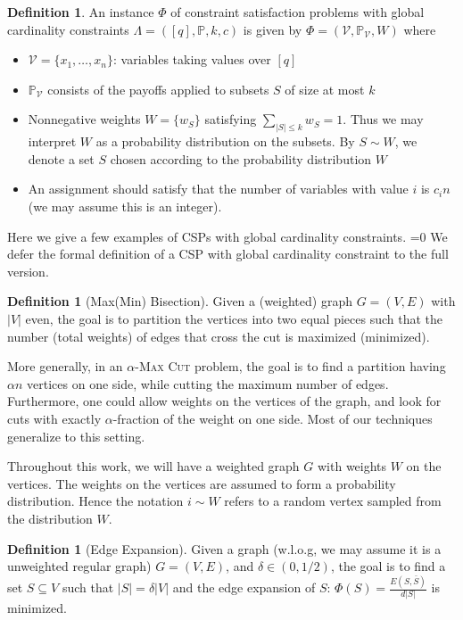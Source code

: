 \documentclass[11pt]{article}
\def\full{1}
\theoremstyle{definition}
\newtheorem{definition}[theorem]{Definition}
\newcommand{\problemmacro}[1]{\texorpdfstring{\textsc{#1}}{#1}\xspace}
\newcommand{\maxcut}{\problemmacro{Max Cut}}
\renewcommand{\leq}{\leqslant}
\numberwithin{equation}{section}
\begin{document}
\begin{definition}
An instance $\Phi$ of constraint satisfaction problems with global
cardinality constraints $\Lambda=([q],\mathbb{P},k,c)$ is given by $\Phi=(\mathcal{V},\mathbb{P}_{\mathcal{V}},W)$ where
\begin{itemize}
\item $\mathcal{V}=\{x_1,\ldots,x_n\}$: variables taking values over $[q]$
\item $\mathbb{P}_{\mathcal{V}}$ consists of the payoffs applied to subsets $S$ of size at most $k$
\item Nonnegative weights $W=\{w_S\}$ satisfying $\sum_{|S|\leq k}w_S=1$. Thus we may interpret $W$ as a probability distribution on the subsets. By $S\sim W$, we denote a set $S$ chosen according to the probability distribution $W$
\item An assignment should satisfy that the number of variables with value $i$ is $c_i n$ (we may assume this is an integer).
\end{itemize}
\end{definition}
\fi
Here we give a few examples of CSPs with global cardinality
constraints.
\ifnum\full=0
We defer the formal definition of a CSP with global
cardinality constraint to the full version.
\fi
\begin{definition} [Max(Min) Bisection]
Given a (weighted) graph $G=(V,E)$ with $|V|$ even, the goal is to partition the vertices into two equal pieces such that the number (total weights) of edges that cross the cut is maximized (minimized).
\end{definition}
More generally, in an $\alpha$-\maxcut problem, the goal is to find a
partition having $\alpha n$ vertices on one side, while cutting the
maximum number of edges.  Furthermore, one could allow weights on the
vertices of the graph, and look for cuts with exactly
$\alpha$-fraction of the weight on one side.  Most of our techniques
generalize to this setting.

Throughout this work, we will have a weighted graph $G$ with weights
$W$ on the vertices.  The weights on the vertices are assumed to form
a probability distribution.  Hence the notation $i \sim W$ refers to
a random vertex sampled from the distribution $W$.

\begin{definition} [Edge Expansion]
Given a graph (w.l.o.g, we may assume it is a unweighted regular graph) $G=(V,E)$, and $\delta\in(0,1/2)$, the goal is to find a set $S\subseteq V$ such that $|S|=\delta |V|$ and the edge expansion of $S$: $\Phi(S)=\frac{E(S,\bar{S})}{d|S|}$ is minimized.
\end{definition}
\end{document}
